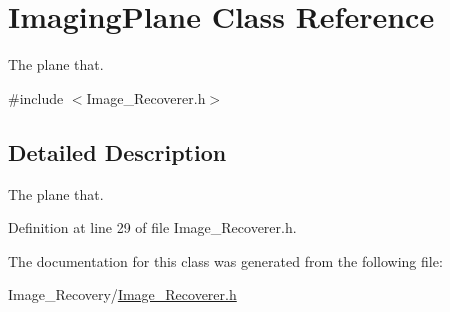 \hypertarget{class_imaging_plane}{}\section{Imaging\+Plane Class Reference}
\label{class_imaging_plane}


The plane that.  




{\ttfamily \#include $<$Image\+\_\+\+Recoverer.\+h$>$}



\subsection{Detailed Description}
The plane that. 

Definition at line 29 of file Image\+\_\+\+Recoverer.\+h.



The documentation for this class was generated from the following file\+:\begin{DoxyCompactItemize}
\item 
Image\+\_\+\+Recovery/\hyperlink{_image___recoverer_8h}{Image\+\_\+\+Recoverer.\+h}\end{DoxyCompactItemize}
